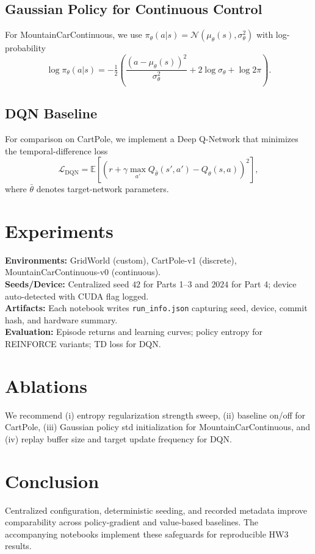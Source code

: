 \documentclass[10pt,conference]{IEEEtran}
\begin{document}
\subsection{Gaussian Policy for Continuous Control}
For MountainCarContinuous, we use $\pi_\theta(a|s)=\mathcal{N}(\mu_\theta(s), \sigma_\theta^2)$ with log-probability
\begin{equation}
\log \pi_\theta(a|s) = -\tfrac{1}{2}\left(\frac{(a-\mu_\theta(s))^2}{\sigma_\theta^2} + 2\log \sigma_\theta + \log 2\pi\right).
\end{equation}

\subsection{DQN Baseline}
For comparison on CartPole, we implement a Deep Q-Network that minimizes the temporal-difference loss
\begin{equation}
\mathcal{L}_{\text{DQN}} = \mathbb{E}\left[\left(r + \gamma \max_{a'} Q_{\bar{\theta}}(s', a') - Q_\theta(s,a)\right)^2\right],
\end{equation}
where $\bar{\theta}$ denotes target-network parameters.

\section{Experiments}
\textbf{Environments:} GridWorld (custom), CartPole-v1 (discrete), MountainCarContinuous-v0 (continuous).\\
\textbf{Seeds/Device:} Centralized seed $42$ for Parts 1--3 and $2024$ for Part 4; device auto-detected with CUDA flag logged.\\
\textbf{Artifacts:} Each notebook writes \texttt{run\_info.json} capturing seed, device, commit hash, and hardware summary.\\
\textbf{Evaluation:} Episode returns and learning curves; policy entropy for REINFORCE variants; TD loss for DQN.

\section{Ablations}
We recommend (i) entropy regularization strength sweep, (ii) baseline on/off for CartPole, (iii) Gaussian policy std initialization for MountainCarContinuous, and (iv) replay buffer size and target update frequency for DQN.

\section{Conclusion}
Centralized configuration, deterministic seeding, and recorded metadata improve comparability across policy-gradient and value-based baselines. The accompanying notebooks implement these safeguards for reproducible HW3 results.
\end{document}
